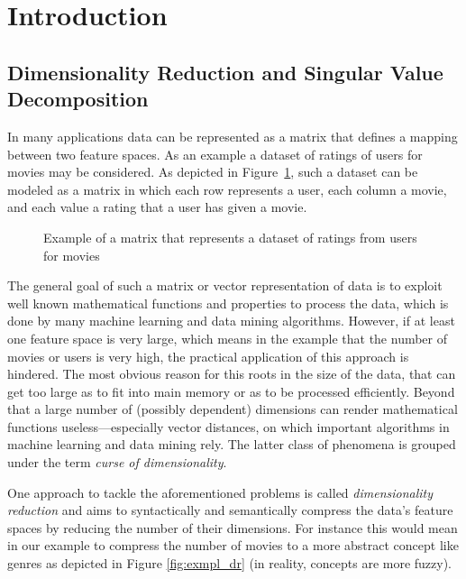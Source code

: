 \section{Introduction}

\subsection{Dimensionality Reduction and Singular Value Decomposition}

In many applications data can be represented as a matrix that defines a mapping
between two feature spaces. As an example a dataset of ratings of users for
movies may be considered. As depicted in Figure~\ref{fig:exmpl_matrix}, such a
dataset can be modeled as a matrix in which each row represents a user, each
column a movie, and each value a rating that a user has given a movie.

\begin{figure}[h]
\centering
{}
\caption{Example of a matrix that represents a dataset of ratings from users
for movies}
\label{fig:exmpl_matrix}
\end{figure}

The general goal of such a matrix or vector representation of data is to
exploit well known mathematical functions and properties to process the data,
which is done by many machine learning and data mining algorithms. However, if
at least one feature space is very large, which means in the example that the
number of movies or users is very high, the practical application of this
approach is hindered. The most obvious reason for this roots in the size of the
data, that can get too large as to fit into main memory or as to be processed
efficiently. Beyond that a large number of (possibly dependent) dimensions can
render mathematical functions useless---especially vector distances, on which
important algorithms in machine learning and data mining rely. The latter class
of phenomena is grouped under the term \textsl{curse of dimensionality}.

One approach to tackle the aforementioned problems is called
\textsl{dimensionality reduction} and aims to syntactically and semantically
compress the data's feature spaces by reducing the number of their dimensions.
For instance this would mean in our example to compress the number of movies to
a more abstract concept like genres as depicted in Figure \ref{fig:exmpl_dr}
(in reality, concepts are more fuzzy).

